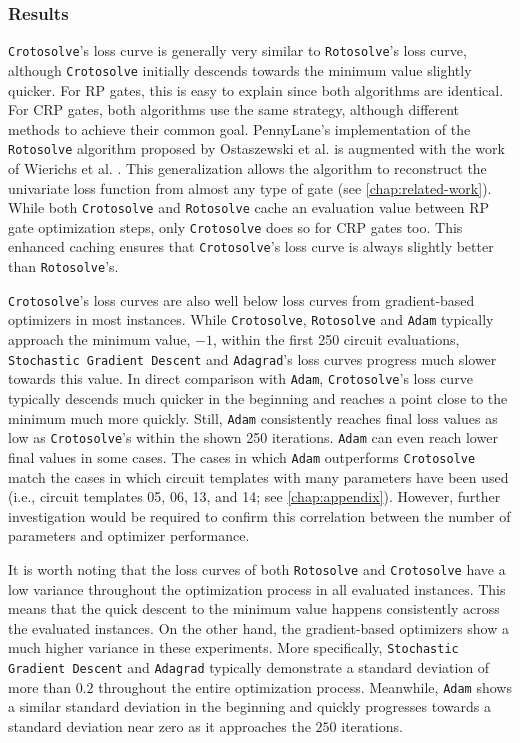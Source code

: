 
\subsubsection*{Results}

\texttt{Crotosolve}'s loss curve is generally very similar to
\texttt{Rotosolve}'s loss curve, although \texttt{Crotosolve} initially descends
towards the minimum value slightly quicker.
For RP gates, this is easy to explain since both algorithms are identical.
For CRP gates, both algorithms use the same strategy, although different methods
to achieve their common goal.
PennyLane's implementation of the \texttt{Rotosolve} algorithm proposed by
Ostaszewski et al. is augmented with the work of Wierichs et al.
\cite{wierichs_general_2022,bergholm_pennylane_2018}.
This generalization allows the algorithm to reconstruct the univariate loss
function from almost any type of gate (see \autoref{chap:related-work}).
While both \texttt{Crotosolve} and \texttt{Rotosolve} cache an evaluation value
between RP gate optimization steps, only \texttt{Crotosolve} does so for
CRP gates too.
This enhanced caching ensures that \texttt{Crotosolve}'s loss curve is always
slightly better than \texttt{Rotosolve}'s.

\texttt{Crotosolve}'s loss curves are also well below loss curves from
gradient-based optimizers in most instances.
While \texttt{Crotosolve}, \texttt{Rotosolve} and \texttt{Adam} typically
approach the minimum value, $-1$, within the first 250 circuit evaluations,
\texttt{Stochastic Gradient Descent} and \texttt{Adagrad}'s loss curves progress
much slower towards this value.
In direct comparison with \texttt{Adam}, \texttt{Crotosolve}'s loss curve
typically descends much quicker in the beginning and reaches a point close to
the minimum much more quickly.
Still, \texttt{Adam} consistently reaches final loss values as low as
\texttt{Crotosolve}'s within the shown 250 iterations.
\texttt{Adam} can even reach lower final values in some cases.
The cases in which \texttt{Adam} outperforms \texttt{Crotosolve} match the
cases in which circuit templates with many parameters have been used (i.e.,
circuit templates 05, 06, 13, and 14; see \autoref{chap:appendix}).
However, further investigation would be required to confirm this correlation
between the number of parameters and optimizer performance.

It is worth noting that the loss curves of both \texttt{Rotosolve} and
\texttt{Crotosolve} have a low variance throughout the optimization process in
all evaluated instances.
This means that the quick descent to the minimum value happens consistently
across the evaluated instances.
On the other hand, the gradient-based optimizers show a much higher variance in
these experiments.
More specifically, \texttt{Stochastic Gradient Descent} and \texttt{Adagrad}
typically demonstrate a standard deviation of more than $0.2$ throughout the
entire optimization process.
Meanwhile, \texttt{Adam} shows a similar standard deviation in the beginning and
quickly progresses towards a standard deviation near zero as it approaches the
$250$ iterations.

